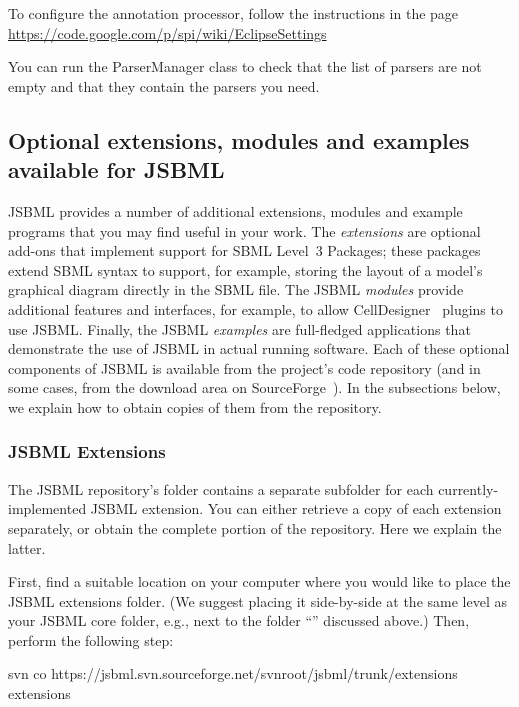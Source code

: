 To configure the annotation processor, follow the instructions in the page 
\url{https://code.google.com/p/spi/wiki/EclipseSettings}

You can run the ParserManager class to check that the list of parsers are not 
empty and that they contain the parsers you need.


\subsection{Optional extensions, modules and examples available for JSBML}
\label{sec:dependencies}

JSBML provides a number of additional extensions, modules and example
programs that you may find useful in your work.  The \emph{extensions} are
optional add-ons that implement support for SBML Level~3 Packages; these
packages extend SBML syntax to support, for example, storing the layout of
a model's graphical diagram directly in the SBML file.  The JSBML
\emph{modules} provide additional features and interfaces, for example, to
allow CellDesigner~\cite{Funahashi2003} plugins to use JSBML.  Finally, the
JSBML \emph{examples} are full-fledged applications that demonstrate the
use of JSBML in actual running software.  Each of these optional components
of JSBML is available from the project's code repository (and in some
cases, from the download area on SourceForge~\cite{JSBMLdownload}).  In the
subsections below, we explain how to obtain copies of them from the
repository.


\subsubsection{JSBML Extensions}

The JSBML repository's  folder contains a separate
subfolder for each currently-implemented JSBML extension. You can either
retrieve a copy of each extension separately, or obtain the complete
 portion of the repository.  Here we explain the latter.

First, find a suitable location on your computer where you would like to
place the JSBML extensions folder.  (We suggest placing it side-by-side at
the same level as your JSBML core folder, e.g., next to the folder
``\dirname'' discussed above.)  Then, perform the following step:

\begin{example}[style=bash, title={Downloading the latest JSBML extensions
    source folder from the project's Subversion repository.}] 
svn co https://jsbml.svn.sourceforge.net/svnroot/jsbml/trunk/extensions extensions
\end{example}

